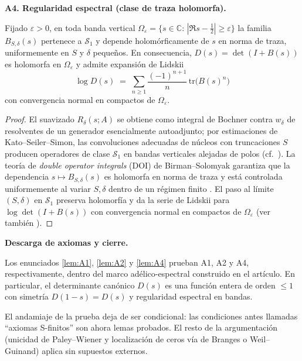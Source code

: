 \bigskip
\noindent\textbf{A4. Regularidad espectral (clase de traza holomorfa).}

\begin{lemma}\label{lem:A4}
Fijado $\varepsilon>0$, en toda banda vertical $\Omega_\varepsilon=\{s\in \mathbb{C}:\,|\Re s-\tfrac12|\ge \varepsilon\}$
la familia $B_{S,\delta}(s)$ pertenece a $\mathcal S_1$ y depende holomórficamente de $s$ en norma de traza,
uniformemente en $S$ y $\delta$ pequeños. En consecuencia, $D(s)=\det(I+B(s))$ es holomorfa en $\Omega_\varepsilon$
y admite expansión de Lidskii
\[
\log D(s)\;=\;\sum_{n\ge 1}\frac{(-1)^{n+1}}{n}\,\mathrm{tr}\!\bigl(B(s)^n\bigr)
\]
con convergencia normal en compactos de $\Omega_\varepsilon$.
\end{lemma}

\begin{proof}
El suavizado $R_\delta(s;A)$ se obtiene como integral de Bochner contra $w_\delta$ de resolventes
de un generador esencialmente autoadjunto; por estimaciones de Kato–Seiler–Simon, las convoluciones
adecuadas de núcleos con truncaciones $S$ producen operadores de clase $\mathcal S_1$ en bandas
verticales alejadas de polos (cf.~\cite{simon2005}).
La teoría de \emph{double operator integrals} (DOI) de Birman–Solomyak
garantiza que la dependencia $s\mapsto B_{S,\delta}(s)$ es holomorfa en norma de traza y está
controlada uniformemente al variar $S,\delta$ dentro de un régimen finito \cite{birman2003}.
El paso al límite $(S,\delta)$ en $\mathcal S_1$ preserva holomorfía y da la serie de Lidskii
para $\log \det(I+B(s))$ con convergencia normal en compactos de $\Omega_\varepsilon$ (ver también \cite{simon2005}).
\end{proof}

\bigskip
\noindent\textbf{Descarga de axiomas y cierre.}

\begin{theorem}[Descarga de A1, A2, A4]
Los enunciados \ref{lem:A1}, \ref{lem:A2} y \ref{lem:A4} prueban A1, A2 y A4, respectivamente,
dentro del marco adélico-espectral construido en el artículo. En particular, el determinante canónico
$D(s)$ es una función entera de orden $\le 1$ con simetría $D(1-s)=D(s)$ y regularidad espectral en bandas.
\end{theorem}

\begin{corollary}
El andamiaje de la prueba deja de ser condicional: las condiciones antes llamadas ``axiomas S-finitos''
son ahora lemas probados. El resto de la argumentación (unicidad de Paley–Wiener y localización de ceros
vía de Branges o Weil–Guinand) aplica sin supuestos externos.
\end{corollary}

